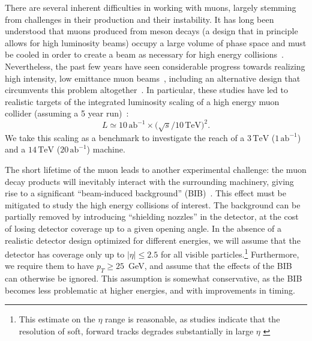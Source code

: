 \documentclass[a4paper,11pt]{article}
\begin{document}
There are several inherent difficulties in working with muons, largely stemming from challenges in their production and their instability. 
It has long been understood that muons produced from meson decays (a design that in principle allows for high luminosity beams) occupy a large volume of phase space and must be cooled in order to create a beam as necessary for high energy collisions~\cite{Parkhomchuk:1983ua,Neuffer:1983jr,Neuffer:1986dg,Kaplan:2014xda,Adey:2015iha}.
Nevertheless, the past few years have seen considerable progress towards realizing high intensity, low emittance muon beams~\cite{Bogomilov:2019kfj,Bonesini:2019dyo,Long:2020wfp,Young:2020wcv}, including an alternative design that circumvents this problem altogether~\cite{Antonelli:2019uoe,Antonelli:2015nla,Boscolo:2018tlu}.
In particular, these studies have led to realistic targets of the integrated luminosity scaling of a high energy muon collider (assuming a 5 year run)~\cite{Delahaye:2019omf}:
\begin{equation}
    L \simeq 10\,\textrm{ab}^{-1} \times \big( \sqrt{s} / 10\,\textrm{TeV} \big)^2.
    \label{eq:lumi}
\end{equation}
We take this scaling as a benchmark to investigate the reach of a $3\,\textrm{TeV}$ ($1\,\textrm{ab}^{-1}$) and a $14\,\textrm{TeV}$ ($20\,\textrm{ab}^{-1}$) machine.



The short lifetime of the muon leads to another experimental challenge: the muon decay products will inevitably interact with the surrounding machinery, giving rise to a significant ``beam-induced background'' (BIB)~\cite{Cummings:2011zz,Kahn:2011zz,Mokhov:2011zzd,Mokhov:2014hza,DiBenedetto:2018cpy,Bartosik:2019dzq,Bartosik:2020xwr,Lucchesi:2020dku}. This effect must be mitigated to study the high energy collisions of interest.
The background can be partially removed by introducing ``shielding nozzles'' in the detector, at the cost of losing detector coverage up to a given opening angle.
In the absence of a realistic detector design optimized for different energies, we will assume that the detector has coverage only up to $|\eta| \leq 2.5$ for all visible particles.\footnote{This estimate on the $\eta$ range is reasonable, as studies indicate that the resolution of soft, forward tracks degrades substantially in large $\eta$ \cite{Bartosik:2020xwr}} Furthermore, we require them to have $p_T \geq 25$~GeV, and assume that the effects of the BIB can otherwise be ignored. 
This assumption is somewhat conservative, as the BIB becomes less problematic at higher energies, and with improvements in timing.
\end{document}
